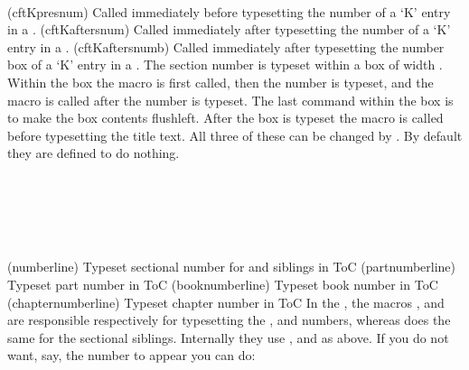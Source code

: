 \begin{syntax}
\cmd{\cftKpresnum} \cmd{\cftKaftersnum} \cmd{\cftKaftersnumb} \\
\end{syntax}
\glossary(cftKpresnum)%
  {}%
  {Called immediately before typesetting the number of a `K' entry in a \listofx.} 
\glossary(cftKaftersnum)%
  {}%
  {Called immediately after typesetting the number of a `K' entry in a \listofx.} 
\glossary(cftKaftersnumb)%
  {}%
  {Called immediately after typesetting the number box of a `K' entry in a \listofx.} 
 The section number is typeset within a box of width \lnc{\cftKnumwidth}.
 Within the box the macro \cmd{\cftKpresnum} is first called, then the
 number is typeset, and the \cmd{\cftKaftersnum}
 macro is called after the number is typeset. The last command
 within the box is \cmd{\hfil} to make the box contents flushleft.
 After the box is
 typeset the \cmd{\cftKaftersnumb} macro is called before typesetting
 the title text. All three of these can be changed by \cmd{\renewcommand}.
 By default they are defined to do nothing.


\begin{syntax}
\cmd{\numberline} \\
\cmd{\partnumberline} \\
\cmd{\partnumberline} \\
\cmd{\chapternumberline} \\
\end{syntax}
\glossary(numberline)
  {}
  {Typeset sectional number for  and siblings in ToC}
\glossary(partnumberline)
  {}
  {Typeset part number in ToC}
\glossary(booknumberline)
  {}
  {Typeset book number in ToC}
\glossary(chapternumberline)
  {}
  {Typeset chapter number in ToC}
In the \toc, the macros \cmd{\booknumberline}, \cmd{\partnumberline} and 
\cmd{\chapternumberline}
are responsible respectively for typesetting the \cmd{\book}, \cmd{\part} 
and \cmd{\chapter}
numbers, whereas \cmd{\numberline} does the same for the sectional
siblings. Internally they use \cmd{\cftKpresnum}, \cmd{\cftKaftersnum}
and \cmd{\cftKaftersnumb} as above. If you do not want, say, 
the \cmd{\chapter} number to appear you
can do:
\begin{lcode}
\renewcommand{\chapternumberline}[1]{}
\end{lcode}


